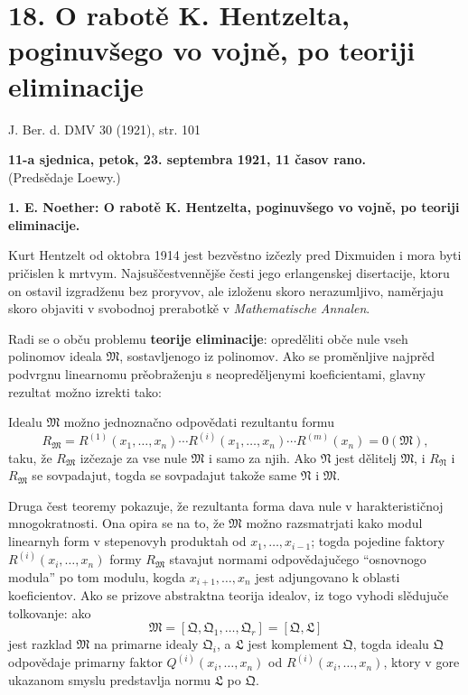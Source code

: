 \documentclass[11pt]{article}
\begin{document}

\setcounter{footnote}{0}
\section*{18. O rabotě K. Hentzelta, poginuvšego vo vojně, po teoriji eliminacije}
\begin{center}
J. Ber. d. DMV 30 (1921), str. 101
\end{center}

\begin{center}
\textbf{11-a sjednica, petok, 23. septembra 1921, 11 časov rano.}\\
(Predsědaje Loewy.)
\end{center}

\textbf{1. E. Noether: O rabotě K. Hentzelta, poginuvšego vo vojně, po teoriji eliminacije.}

Kurt Hentzelt od oktobra 1914 jest bezvěstno izčezly pred Dixmuiden i mora byti pričislen k mrtvym. Najsuščestvennějše česti jego erlangenskej disertacije, ktoru on ostavil izgradženu bez proryvov, ale izloženu skoro nerazumljivo, naměrjaju skoro objaviti v svobodnoj prerabotkě v \emph{Mathematische Annalen}.

Radi se o obču problemu \textbf{teorije eliminacije}: opreděliti obče nule vseh polinomov ideala \(\mathfrak M\), sostavljenogo iz polinomov. Ako se proměnljive najprěd podvrgnu linearnomu prěobraženju s neopreděljenymi koeficientami, glavny rezultat možno izrekti tako:

Idealu \(\mathfrak M\) možno jednoznačno odpovědati rezultantu formu
\[
 R_{\mathfrak M}=R^{(1)}(x_1,
\ldots,x_n)\cdots R^{(i)}(x_1,
\ldots,x_n)\cdots R^{(m)}(x_n)=0(\mathfrak M),
\]
taku, že \(R_{\mathfrak M}\) izčezaje za vse nule \(\mathfrak M\) i samo za njih. Ako \(\mathfrak N\) jest dělitelj \(\mathfrak M\), i \(R_{\mathfrak N}\) i \(R_{\mathfrak M}\) se sovpadajut, togda se sovpadajut takože same \(\mathfrak N\) i \(\mathfrak M\).

Druga čest teoremy pokazuje, že rezultanta forma dava nule v harakterističnoj mnogokratnosti. Ona opira se na to, že \(\mathfrak M\) možno razsmatrjati kako modul linearnyh form v stepenovyh produktah od \(x_1,
\ldots,x_{i-1}\); togda pojedine faktory \(R^{(i)}(x_i,
\ldots,x_n)\) formy \(R_{\mathfrak M}\) stavajut normami odpovědajučego ``osnovnogo modula'' po tom modulu, kogda \(x_{i+1},
\ldots,x_n\) jest adjungovano k oblasti koeficientov. Ako se prizove abstraktna teorija idealov, iz togo vyhodi slědujuče tolkovanje: ako
\[
 \mathfrak M=[\mathfrak Q,\mathfrak Q_1,
\ldots,
\mathfrak Q_r]=[\mathfrak Q,\mathfrak L]
\]
jest razklad \(\mathfrak M\) na primarne idealy \(\mathfrak Q_i\), a \(\mathfrak L\) jest komplement \(\mathfrak Q\), togda idealu \(\mathfrak Q\) odpovědaje primarny faktor \(Q^{(i)}(x_i,
\ldots,x_n)\) od \(R^{(i)}(x_i,
\ldots,x_n)\), ktory v gore ukazanom smyslu predstavlja normu \(\mathfrak L\) po \(\mathfrak Q\).

\clearpage
\end{document}
